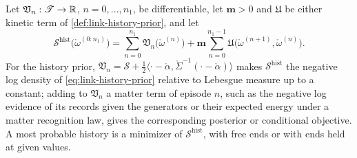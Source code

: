 Let $\mathfrak V_n:\mathscr T\to\mathbb R$, $n=0,\ldots,n_1$, be differentiable, let $\mathbf m>0$ and
$\mathfrak U$ be either kinetic term of \cref{def:link-history-prior}, and let
\begin{equation}
\mathscr S^{\mathrm{hist}}\bigl(\mathring\omega^{(0:n_1)}\bigr)=\sum_{n=0}^{n_1}\mathfrak V_n\bigl(\mathring\omega^{(n)}\bigr)
+\mathbf m\sum_{n=0}^{n_1-1}\mathfrak U\bigl(\mathring\omega^{(n+1)},\mathring\omega^{(n)}\bigr).
\label{eq:link-history-action}
\end{equation}
For the history prior, $\mathfrak V_n=\mathscr S+\tfrac12\langle\cdot-\mathring\alpha,\mathring\Sigma^{-1}(\cdot-\mathring\alpha)\rangle$
makes $\mathscr S^{\mathrm{hist}}$ the negative log density of \eqref{eq:link-history-prior} relative to Lebesgue measure up
to a constant; adding to $\mathfrak V_n$ a matter term of episode $n$, such as the negative log
evidence of its records given the generators or their expected energy under a matter recognition law,
gives the corresponding posterior or conditional objective. A most probable history is a minimizer of
$\mathscr S^{\mathrm{hist}}$, with free ends or with ends held at given values.
